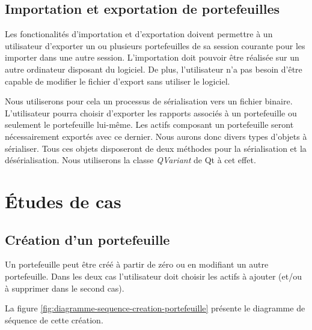 \documentclass[a4paper,titlepage,french]{report}
\begin{document}
\subsection{Importation et exportation de portefeuilles}

Les fonctionalités d'importation et d'exportation doivent permettre à un utilisateur d'exporter un ou plusieurs portefeuilles de sa session courante pour les importer dans une autre session.
L'importation doit pouvoir être réalisée sur un autre ordinateur disposant du logiciel.
De plus, l'utilisateur n'a pas besoin d'être capable de modifier le fichier d'export sans utiliser le logiciel.

Nous utiliserons pour cela un processus de sérialisation vers un fichier binaire.
L'utilisateur pourra choisir d'exporter les rapports associés à un portefeuille ou seulement le portefeuille lui-même.
Les actifs composant un portefeuille seront nécessairement exportés avec ce dernier.
Nous aurons donc divers types d'objets à sérialiser.
Tous ces objets disposeront de deux méthodes pour la sérialisation et la désérialisation.
Nous utiliserons la classe \textit{QVariant} de Qt à cet effet.


\section{\'Etudes de cas}

\subsection{Création d'un portefeuille}
Un portefeuille peut être créé à partir de zéro ou en modifiant un autre portefeuille.
Dans les deux cas l'utilisateur doit choisir les actifs à ajouter (et/ou à supprimer dans le second cas).

La figure \ref{fig:diagramme-sequence-creation-portefeuille} présente le diagramme de séquence de cette création.
\end{document}

